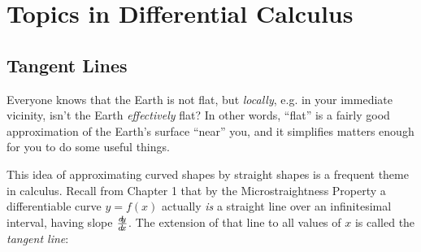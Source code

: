 \chapter{Topics in Differential Calculus}
\section{Tangent Lines}
Everyone knows that the Earth is not flat, but \emph{locally}, e.g. in your
immediate vicinity, isn't the Earth \emph{effectively} flat? In other words,
``flat'' is a fairly good approximation of the Earth's surface ``near'' you,
and it simplifies matters enough for you to do some useful things.

This idea of approximating curved shapes by straight shapes is a frequent theme
in calculus. Recall from Chapter 1 that by the Microstraightness Property a
differentiable curve $y = f(x)$ actually \emph{is} a straight line over an
infinitesimal interval, having slope $\frac{d\negmedspace y}{d\!x}$. The extension of that line to all
values of $x$ is called the
\emph{tangent line}:


